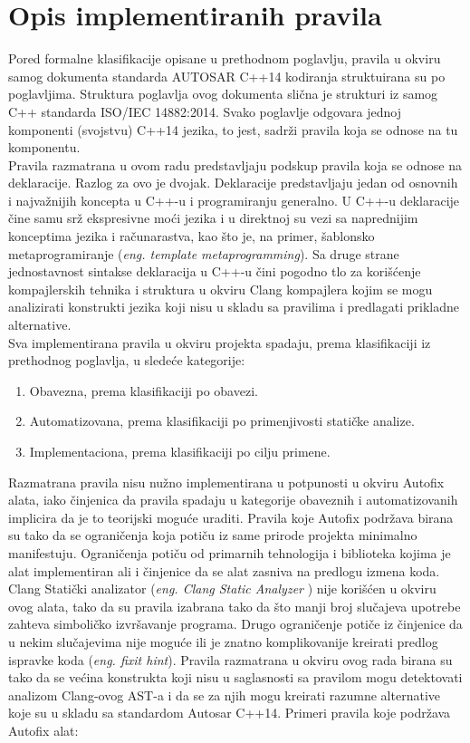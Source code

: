 \documentclass[12pt,oneside]{memoir}
\begin{document}
\section{Opis implementiranih pravila}

Pored formalne klasifikacije opisane u prethodnom poglavlju, pravila u okviru samog dokumenta standarda AUTOSAR C++14  kodiranja struktuirana su po poglavljima.
Struktura poglavlja ovog dokumenta slična je strukturi iz samog C++ standarda ISO/IEC 14882:2014. Svako poglavlje odgovara jednoj komponenti (svojstvu) C++14 jezika, to jest, sadrži pravila koja se odnose na tu komponentu.
\\
\indent
Pravila razmatrana u ovom radu predstavljaju podskup pravila koja se odnose na deklaracije. Razlog za ovo je dvojak. Deklaracije predstavljaju jedan
od osnovnih i najvažnijih koncepta u C++-u i programiranju generalno. U C++-u deklaracije čine samu srž ekspresivne moći jezika i u direktnoj su vezi
sa naprednijim konceptima jezika i računarastva, kao što je, na primer, šablonsko metaprogramiranje (\textit{eng. template metaprogramming}).
Sa druge strane jednostavnost sintakse deklaracija u C++-u čini pogodno tlo za korišćenje kompajlerskih tehnika i struktura u okviru Clang kompajlera kojim se mogu analizirati konstrukti jezika koji nisu u skladu sa pravilima i predlagati prikladne alternative.
\\
\indent
Sva implementirana pravila u okviru projekta spadaju, prema klasifikaciji iz prethodnog poglavlja, u sledeće kategorije:
\begin{enumerate}
  \item{Obavezna, prema klasifikaciji po obavezi.}
  \item{Automatizovana, prema klasifikaciji po primenjivosti statičke analize.}
  \item{Implementaciona, prema klasifikaciji po cilju primene.}
\end{enumerate}

Razmatrana pravila nisu nužno implementirana u potpunosti u okviru Autofix alata, iako činjenica da pravila spadaju u kategorije obaveznih i automatizovanih
implicira da je to teorijski moguće uraditi. Pravila koje Autofix podržava birana su tako da se ograničenja koja potiču iz same prirode projekta minimalno manifestuju. Ograničenja potiču od primarnih tehnologija i biblioteka kojima je alat implementiran ali i činjenice da se alat zasniva na predlogu izmena koda. 
Clang Statički analizator (\textit{eng. Clang Static Analyzer} \cite{CSAWebsite}) nije korišćen u okviru ovog alata, tako da su pravila izabrana tako da što manji broj slučajeva upotrebe zahteva simboličko izvršavanje programa. Drugo ograničenje potiče iz činjenice da u nekim slučajevima nije moguće ili je znatno komplikovanije kreirati predlog ispravke koda (\textit{eng. fixit hint}). Pravila razmatrana u okviru ovog rada birana su tako da se većina konstrukta koji nisu u saglasnosti sa pravilom mogu detektovati analizom Clang-ovog AST-a i da se za njih mogu kreirati razumne alternative koje su u skladu sa standardom Autosar C++14.
Primeri pravila koje podržava Autofix alat:
\end{document}
